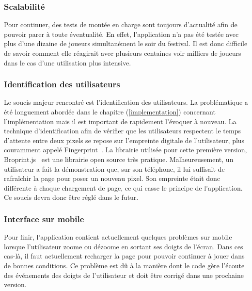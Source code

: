 \subsubsection{Scalabilité}
Pour continuer, des tests de montée en charge sont toujours d'actualité afin de pouvoir parer à toute éventualité. En effet, l'application n'a pas été testée avec plus d'une dizaine de joueurs simultanément le soir du festival. Il est donc difficile de savoir comment elle réagirait avec plusieurs centaines voir milliers de joueurs dans le cas d'une utilisation plus intensive.

\subsubsection{Identification des utilisateurs}
Le soucis majeur rencontré est l'identification des utilisateurs. La problématique a été longuement abordée dans le chapitre (\ref{implementation}) concernant l'implémentation mais il est important de rapidement l'évoquer à nouveau. La technique d'identification afin de vérifier que les utilisateurs respectent le temps d'attente entre deux pixels se repose sur l'empreinte digitale de l'utilisateur, plus couramment appelé Fingerprint~\cite{devicefingerprint}. La librairie utilisée pour cette première version, Broprint.js~\cite{broprintjs} est une librairie open source très pratique. Malheureusement, un utilisateur a fait la démonstration que, sur son téléphone, il lui suffisait de rafraîchir la page pour poser un nouveau pixel. Son empreinte était donc différente à chaque chargement de page, ce qui casse le principe de l'application. Ce soucis devra donc être réglé dans le futur.

\subsubsection{Interface sur mobile}
Pour finir, l'application contient actuellement quelques problèmes sur mobile lorsque l'utilisateur zoome ou dézoome en sortant ses doigts de l'écran. Dans ces cas-là, il faut actuellement recharger la page pour pouvoir continuer à jouer dans de bonnes conditions. Ce problème est dû à la manière dont le code gère l'écoute des événements des doigts de l'utilisateur et doit être corrigé dans une prochaine version.
